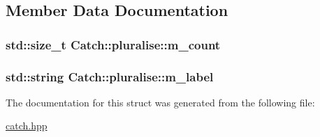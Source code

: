\subsection{Member Data Documentation}
\hypertarget{struct_catch_1_1pluralise_a4dce2fa13ec6f00fac09b2418265441e}{
\subsubsection[{m\-\_\-count}]{\setlength{\rightskip}{0pt plus 5cm}std\-::size\-\_\-t Catch\-::pluralise\-::m\-\_\-count}}\label{struct_catch_1_1pluralise_a4dce2fa13ec6f00fac09b2418265441e}
\hypertarget{struct_catch_1_1pluralise_a8849cbdd3f11ebe7747597c8644e8793}{
\subsubsection[{m\-\_\-label}]{\setlength{\rightskip}{0pt plus 5cm}std\-::string Catch\-::pluralise\-::m\-\_\-label}}\label{struct_catch_1_1pluralise_a8849cbdd3f11ebe7747597c8644e8793}


The documentation for this struct was generated from the following file\-:\begin{DoxyCompactItemize}
\item 
\hyperlink{catch_8hpp}{catch.\-hpp}\end{DoxyCompactItemize}
